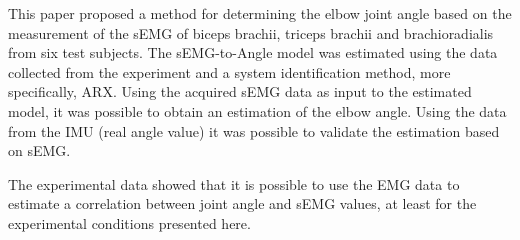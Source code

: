 \documentclass[letterpaper, 10 pt, conference]{ieeeconf}  %
\begin{document}
This paper proposed a method for determining the elbow joint angle based on the measurement of the sEMG of biceps brachii, triceps brachii and brachioradialis from six test subjects. The sEMG-to-Angle model was estimated using the data collected from the experiment and a system identification method, more specifically, ARX. Using the acquired sEMG data as input to the estimated model, it was possible to obtain an estimation of the elbow angle. Using the data from the IMU (real angle value) it was possible to validate the estimation based on sEMG.


The experimental data showed that it is possible to use the EMG data to estimate a correlation between joint angle and sEMG values, at least for the experimental conditions presented here.
\end{document}
